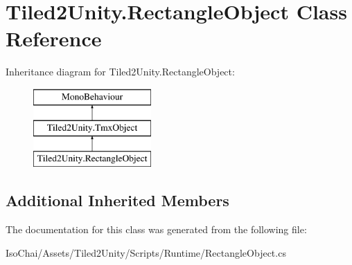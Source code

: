 \hypertarget{class_tiled2_unity_1_1_rectangle_object}{}\section{Tiled2\+Unity.\+Rectangle\+Object Class Reference}
\label{class_tiled2_unity_1_1_rectangle_object}
Inheritance diagram for Tiled2\+Unity.\+Rectangle\+Object\+:\begin{figure}[H]
\begin{center}
\leavevmode
\includegraphics[height=3.000000cm]{class_tiled2_unity_1_1_rectangle_object}
\end{center}
\end{figure}
\subsection*{Additional Inherited Members}


The documentation for this class was generated from the following file\+:\begin{DoxyCompactItemize}
\item 
Iso\+Chai/\+Assets/\+Tiled2\+Unity/\+Scripts/\+Runtime/Rectangle\+Object.\+cs\end{DoxyCompactItemize}
